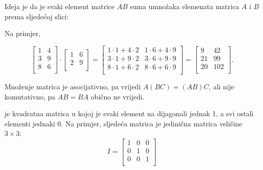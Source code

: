 Ideja je da je svaki element matrice $AB$
suma umnožaka elemenata matrica $A$ i $B$
prema sljedećoj slici:

\begin{center}
\end{center}

Na primjer,

\[
 \begin{bmatrix}
  1 & 4 \\
  3 & 9 \\
  8 & 6 \\
 \end{bmatrix}
\cdot
 \begin{bmatrix}
  1 & 6 \\
  2 & 9 \\
 \end{bmatrix}
=
 \begin{bmatrix}
  1 \cdot 1 + 4 \cdot 2 & 1 \cdot 6 + 4 \cdot 9 \\
  3 \cdot 1 + 9 \cdot 2 & 3 \cdot 6 + 9 \cdot 9 \\
  8 \cdot 1 + 6 \cdot 2 & 8 \cdot 6 + 6 \cdot 9 \\
 \end{bmatrix}
=
 \begin{bmatrix}
  9 & 42 \\
  21 & 99 \\
  20 & 102 \\
 \end{bmatrix}.
\]

Množenje matrica je asocijativno,
pa vrijedi $A(BC)=(AB)C$,
ali nije komutativno,
pa $AB = BA$ obično ne vrijedi.


 je kvadratna matrica
u kojoj je svaki element na dijagonali jednak 1,
a svi ostali elementi jednaki 0.
Na primjer, sljedeća matrica
je jedinična matrica veličine $3 \times 3$:
\[
 I = \begin{bmatrix}
  1 & 0 & 0 \\
  0 & 1 & 0 \\
  0 & 0 & 1 \\
 \end{bmatrix}
\]

